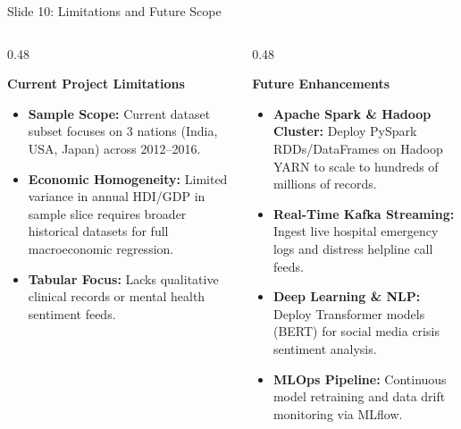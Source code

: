 \documentclass[10pt, aspectratio=169]{beamer}
\begin{document}
\begin{frame}{Slide 10: Limitations and Future Scope}
    \begin{columns}[T]
        \begin{column}{0.48\textwidth}
            \begin{block}{\textbf{Current Project Limitations}}
                \begin{itemize}
                    \item \textbf{Sample Scope:} Current dataset subset focuses on 3 nations (India, USA, Japan) across 2012--2016.
                    \item \textbf{Economic Homogeneity:} Limited variance in annual HDI/GDP in sample slice requires broader historical datasets for full macroeconomic regression.
                    \item \textbf{Tabular Focus:} Lacks qualitative clinical records or mental health sentiment feeds.
                \end{itemize}
            \end{block}
        \end{column}
        \begin{column}{0.48\textwidth}
            \begin{block}{\textbf{Future Enhancements}}
                \begin{itemize}
                    \item \textbf{Apache Spark \& Hadoop Cluster:} Deploy PySpark RDDs/DataFrames on Hadoop YARN to scale to hundreds of millions of records.
                    \item \textbf{Real-Time Kafka Streaming:} Ingest live hospital emergency logs and distress helpline call feeds.
                    \item \textbf{Deep Learning \& NLP:} Deploy Transformer models (BERT) for social media crisis sentiment analysis.
                    \item \textbf{MLOps Pipeline:} Continuous model retraining and data drift monitoring via MLflow.
                \end{itemize}
            \end{block}
        \end{column}
    \end{columns}
\end{frame}
\end{document}
